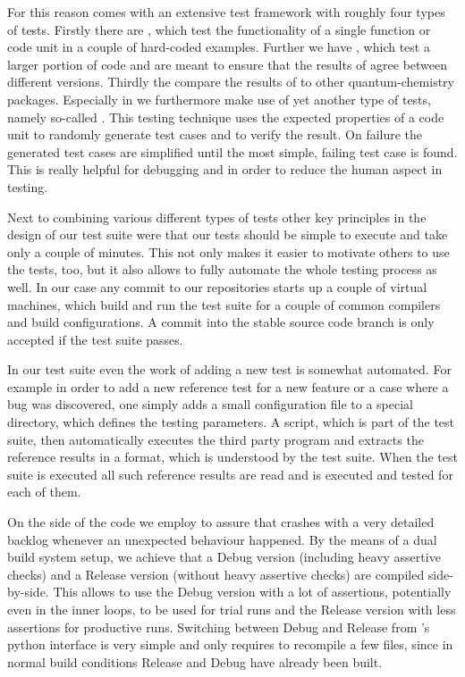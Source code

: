 For this reason \molsturm comes with an extensive test framework
with roughly four types of tests.
Firstly there are ,
which test the functionality of a single function or code unit in a couple of hard-coded examples.
Further we have ,
which test a larger portion of code and are meant to ensure that
the results of \molsturm agree between different versions.
Thirdly the  compare
the results of \molsturm to other quantum-chemistry packages.
Especially in \lazyten we furthermore make use of yet another type of tests,
namely so-called .
This testing technique uses the expected properties of a code unit
to randomly generate test cases and to verify the result.
On failure the generated test cases are simplified until the most simple,
failing test case is found.
This is really helpful for debugging and in order to reduce the human aspect in testing.

Next to combining various different types of tests
other key principles in the design of our test suite were that our tests should be simple
to execute and take only a couple of minutes.
This not only makes it easier to motivate others to use the tests, too,
but it also allows to fully automate the whole testing process as well.
In our case any commit to our repositories starts up a couple of virtual machines,
which build \molsturm and run the test suite for a couple of common compilers and
build configurations.
A commit into the stable source code branch is only accepted if the test suite passes.

In our test suite even the work of adding a new test is somewhat automated.
For example in order to add a new reference test for a new feature
or a case where a bug was discovered,
one simply adds a small configuration file to a special directory,
which defines the testing parameters.
A \python script, which is part of the test suite,
then automatically executes the third party program and extracts the reference results in a format,
which is understood by the \molsturm test suite.
When the test suite is executed all such reference results are read and
\molsturm is executed and tested for each of them.


On the side of the \molsturm code we employ  to assure that
\molsturm crashes with a very detailed backlog whenever an unexpected behaviour happened.
By the means of a dual build system setup, we achieve that a Debug version
(including heavy assertive checks) and a Release version
(without heavy assertive checks) are compiled side-by-side.
This allows to use the Debug version with a lot of assertions,
potentially even in the inner loops,
to be used for trial runs and the Release version with less assertions for productive runs.
Switching between Debug and Release from \molsturm's python interface is very simple and
only requires to recompile a few files,
since in normal build conditions Release and Debug have already been built.


